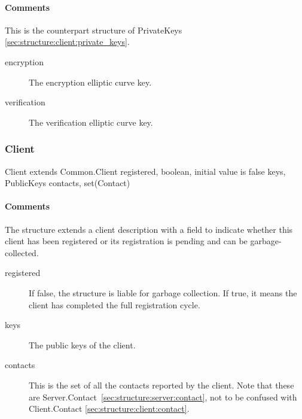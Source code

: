 \documentclass[a4paper,10pt]{article}
\begin{document}
\paragraph*{Comments}
This is the counterpart structure of PrivateKeys \ref{sec:structure:client:private_keys}.

\SpecialItem
\begin{description}
 \item[encryption] The encryption elliptic curve key.
 \item[verification] The verification elliptic curve key.
\end{description}

\subsubsection{Client}

\begin{verbbox}
Client extends Common.Client
{
  registered, boolean, initial value is false
  keys, PublicKeys
  contacts, set(Contact)
}
\end{verbbox}
\begin{center}
\theverbbox
\end{center}

\begin{inparaitem}[ ]
 \item \infrastructure
\end{inparaitem}

\paragraph*{Comments}

The structure extends a client description with a field to indicate whether this client has been registered or its registration is pending and can be garbage-collected.

\SpecialItem
\begin{description}
 \item[registered] If false, the structure is liable for garbage collection. If true, it means the client has completed the full registration cycle.
 \item[keys]  The public keys of the client.
 \item[contacts] This is the set of all the contacts reported by the client. Note that these are Server.Contact~\ref{sec:structure:server:contact}, not to be confused with 
Client.Contact \ref{sec:structure:client:contact}.
\end{description}
\end{document}
